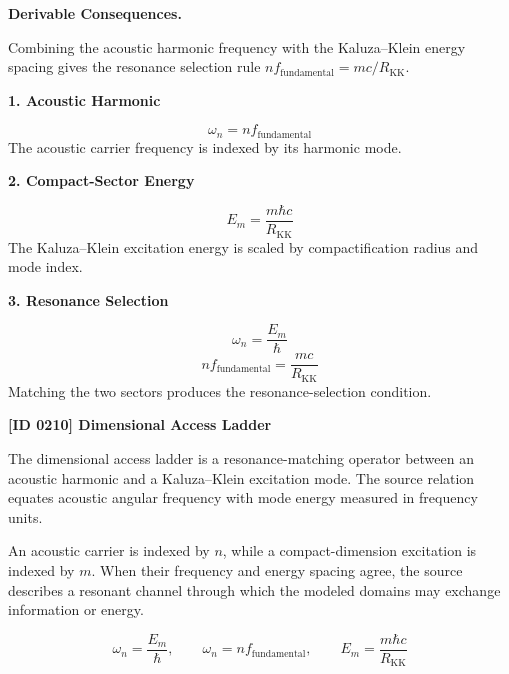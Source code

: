 \par\vspace{0.35em}
\noindent\textbf{Derivable Consequences.}\quad
\begingroup
\footnotesize
\raggedright
Combining the acoustic harmonic frequency with the Kaluza--Klein energy spacing gives the resonance selection rule \(n f_{\mathrm{fundamental}}=m c/R_{\mathrm{KK}}\).
\par\endgroup

\noindent\textbf{1. Acoustic Harmonic}\par
\[
\omega_n=n f_{\mathrm{fundamental}}
\]
\noindent The acoustic carrier frequency is indexed by its harmonic mode.\par
\noindent\textbf{2. Compact-Sector Energy}\par
\[
E_m=\frac{m\hbar c}{R_{\mathrm{KK}}}
\]
\noindent The Kaluza--Klein excitation energy is scaled by compactification radius and mode index.\par
\noindent\textbf{3. Resonance Selection}\par
\[
\omega_n=\frac{E_m}{\hbar}
\]
\[
n f_{\mathrm{fundamental}}=\frac{m c}{R_{\mathrm{KK}}}
\]
\noindent Matching the two sectors produces the resonance-selection condition.\par

\clearpage
\noindent\textbf{[ID 0210] Dimensional Access Ladder}\par
\vspace{0.35em}
\begingroup\small


The dimensional access ladder is a resonance-matching operator between an acoustic harmonic and a Kaluza--Klein excitation mode. The source relation equates acoustic angular frequency with mode energy measured in frequency units.


An acoustic carrier is indexed by \(n\), while a compact-dimension excitation is indexed by \(m\). When their frequency and energy spacing agree, the source describes a resonant channel through which the modeled domains may exchange information or energy.


\[
\omega_n=\frac{E_m}{\hbar},\qquad
\omega_n=n f_{\mathrm{fundamental}},\qquad
E_m=\frac{m\hbar c}{R_{\mathrm{KK}}}
\]


